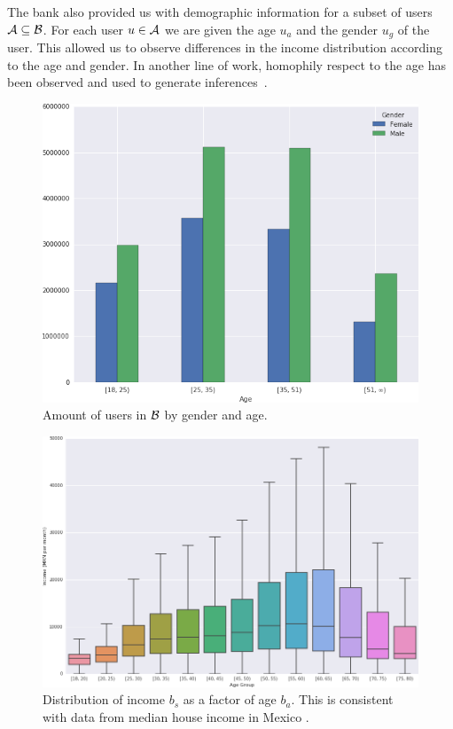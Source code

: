 The bank also provided us with demographic information for a subset of users \( \mathcal{A} \subseteq \mathcal{B} \). For each user \( u \in \mathcal{A} \) we are given  the age \( u_a \) and the gender \( u_g \) of the user. This allowed us to observe differences in the income distribution according to the age and gender. In another line of work, homophily respect to the age has been observed and used to generate inferences~\cite{brea2014}.

\begin{figure}[h]
\begin{center}
\includegraphics[width=0.8\columnwidth]{figures/gender_age_bar3/gender_age_bar3.png}
\caption{Amount of users in \( \mathcal{B} \) by gender and age.}
\label{gender_age_bar}
\end{center}
\end{figure}

\vspace{-1em}

\begin{figure}[h]
\begin{center}
\includegraphics[width=0.95\columnwidth]{figures/income_age_boxplot4/income_age_boxplot4.png}
\caption{Distribution of income $ b_s $ as a factor of age $ b_a $. This is consistent with data from median house income in Mexico \cite{gallup2013}.}
\label{income_age_boxplot}
\end{center}
\end{figure}

